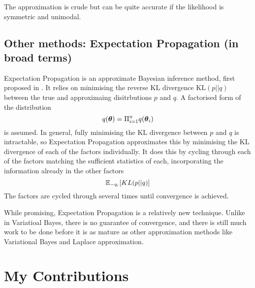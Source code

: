 \documentclass{amsart}[12pt]
\begin{document}
The approximation is crude but can be quite accurate if the likelihood is symmetric and unimodal.
\subsection{Other methods: Expectation Propagation (in broad terms)}
Expectation Propagation is an approximate Bayesian inference method, first proposed in \citep{Minka2001}.
It relies on minimising the reverse KL divergence $\text{KL}(p || q)$ between the true and approximaing
disitrbutions $p$ and $q$. A factorised form of the distribution
\[
	q({\boldsymbol \theta}) = \Pi_{i=1}^n q({\boldsymbol \theta}_i)
\]
is assumed. In general, fully minimising the KL divergence between $p$ and $q$ is intractable, so Expectation
Propagation approximates this by minimising the KL divergence of each of the factors individually.
It does this by cycling through each of the factors matching the sufficient statistics of each, incorporating
the information already in the other factors
\[
	{\mathbb E}_{-q_i} [KL(p || q)]
\]
The factors are cycled through several times until convergence is achieved.

While promising, Expectation Propagation is a relatively new technique.
Unlike in Variatioal Bayes, there is no guarantee of convergence, and there is still much work to be done
before it is as mature as other approximation methods like Variational Bayes and Laplace approximation.

\section{My Contributions}
\end{document}
